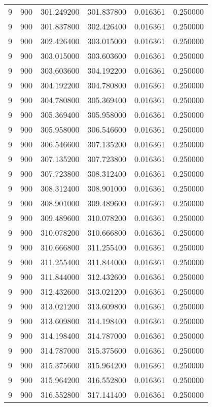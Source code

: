 \begin{longtable}{rrrrrr}
9 & 900 & 301.249200 & 301.837800 & 0.016361 & 0.250000 \\
9 & 900 & 301.837800 & 302.426400 & 0.016361 & 0.250000 \\
9 & 900 & 302.426400 & 303.015000 & 0.016361 & 0.250000 \\
9 & 900 & 303.015000 & 303.603600 & 0.016361 & 0.250000 \\
9 & 900 & 303.603600 & 304.192200 & 0.016361 & 0.250000 \\
9 & 900 & 304.192200 & 304.780800 & 0.016361 & 0.250000 \\
9 & 900 & 304.780800 & 305.369400 & 0.016361 & 0.250000 \\
9 & 900 & 305.369400 & 305.958000 & 0.016361 & 0.250000 \\
9 & 900 & 305.958000 & 306.546600 & 0.016361 & 0.250000 \\
9 & 900 & 306.546600 & 307.135200 & 0.016361 & 0.250000 \\
9 & 900 & 307.135200 & 307.723800 & 0.016361 & 0.250000 \\
9 & 900 & 307.723800 & 308.312400 & 0.016361 & 0.250000 \\
9 & 900 & 308.312400 & 308.901000 & 0.016361 & 0.250000 \\
9 & 900 & 308.901000 & 309.489600 & 0.016361 & 0.250000 \\
9 & 900 & 309.489600 & 310.078200 & 0.016361 & 0.250000 \\
9 & 900 & 310.078200 & 310.666800 & 0.016361 & 0.250000 \\
9 & 900 & 310.666800 & 311.255400 & 0.016361 & 0.250000 \\
9 & 900 & 311.255400 & 311.844000 & 0.016361 & 0.250000 \\
9 & 900 & 311.844000 & 312.432600 & 0.016361 & 0.250000 \\
9 & 900 & 312.432600 & 313.021200 & 0.016361 & 0.250000 \\
9 & 900 & 313.021200 & 313.609800 & 0.016361 & 0.250000 \\
9 & 900 & 313.609800 & 314.198400 & 0.016361 & 0.250000 \\
9 & 900 & 314.198400 & 314.787000 & 0.016361 & 0.250000 \\
9 & 900 & 314.787000 & 315.375600 & 0.016361 & 0.250000 \\
9 & 900 & 315.375600 & 315.964200 & 0.016361 & 0.250000 \\
9 & 900 & 315.964200 & 316.552800 & 0.016361 & 0.250000 \\
9 & 900 & 316.552800 & 317.141400 & 0.016361 & 0.250000 \\

\end{longtable}
